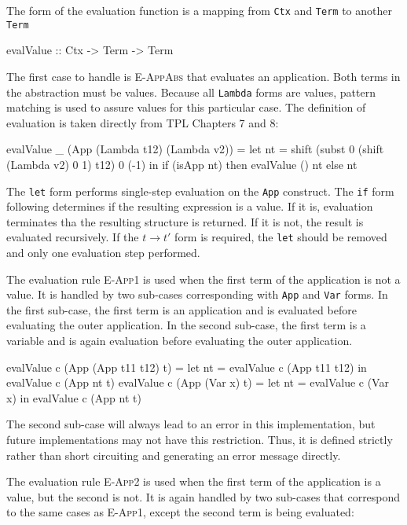 \documentclass[10pt]{article}
\begin{document}
The form of the evaluation function is a mapping from \texttt{Ctx} and
\texttt{Term} to another \texttt{Term}

\begin{code}
  evalValue :: Ctx -> Term -> Term
\end{code}

The first case to handle is \textsc{E-AppAbs} that evaluates an
application.  Both terms in the abstraction must be values.  Because
all \texttt{Lambda} forms are values, pattern matching is used to
assure values for this particular case.  The definition of evaluation
is taken directly from TPL Chapters 7 and 8:

\begin{code}
  evalValue _ (App (Lambda t12) (Lambda v2)) =
        let nt = shift (subst 0 (shift (Lambda v2) 0 1) t12) 0 (-1) in
            if (isApp nt) then evalValue () nt else nt
\end{code}

The \texttt{let} form performs single-step evaluation on the
\texttt{App} construct.  The \texttt{if} form following determines if
the resulting expression is a value.  If it is, evaluation terminates
tha the resulting structure is returned.  If it is not, the result is
evaluated recursively.  If the $t\longrightarrow t'$ form is required,
the \texttt{let} should be removed and only one evaluation step
performed.

The evaluation rule \textsc{E-App1} is used when the first term of the
application is not a value.  It is handled by two sub-cases
corresponding with \texttt{App} and \texttt{Var} forms.  In the first
sub-case, the first term is an application and is evaluated before
evaluating the outer application.  In the second sub-case, the first
term is a variable and is again evaluation before evaluating the outer
application.

\begin{code}
  evalValue c (App (App t11 t12) t) =
      let nt = evalValue c (App t11 t12) in evalValue c (App nt t)
  evalValue c (App (Var x) t) = 
      let nt = evalValue c (Var x) in evalValue c (App nt t)
\end{code}

The second sub-case will always lead to an error in this
implementation, but future implementations may not have this
restriction.  Thus, it is defined strictly rather than short
circuiting and generating an error message directly.

The evaluation rule \textsc{E-App2} is used when the first term of the
application is a value, but the second is not.  It is again handled by
two sub-cases that correspond to the same cases as \textsc{E-App1},
except the second term is being evaluated:
\end{document}
